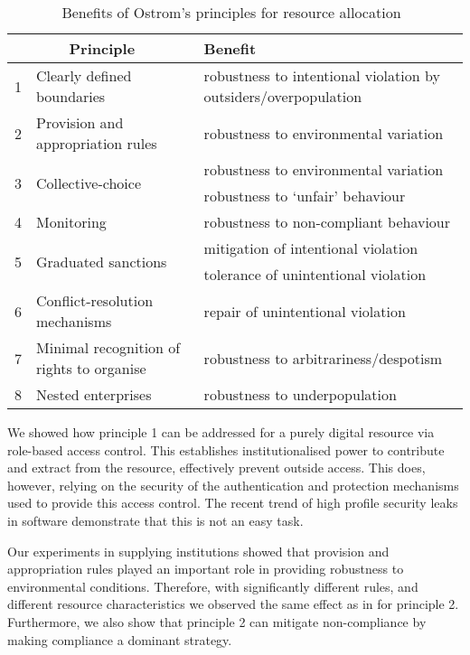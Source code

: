 \begin{table}[ht]
\centering
\caption[Benefits of Ostrom's principles for resource allocation]{Benefits of Ostrom's principles for resource allocation~\citep{Schaumeier2013}}\label{tab:principlebenefit}
\begin{tabularx}{\textwidth}{lp{4cm}X}
\multicolumn{2}{c}{Principle} & Benefit \\
\hline
1 & Clearly defined boundaries & robustness to intentional violation by outsiders/overpopulation \\
2 & Provision and appropriation rules & robustness to environmental variation \\
\multirow{2}{*}{3} & \multirow{2}{*}{Collective-choice} & robustness to environmental variation \\
 & & robustness to `unfair' behaviour \\
4 & Monitoring & robustness to non-compliant behaviour \\
\multirow{2}{*}{5} & \multirow{2}{*}{Graduated sanctions} & mitigation of intentional violation \\
 & & tolerance of unintentional violation \\
6 & Conflict-resolution mechanisms & repair of unintentional violation \\
7 & Minimal recognition of rights to organise & robustness to arbitrariness/despotism \\
8 & Nested enterprises & robustness to underpopulation \\
\end{tabularx}
\end{table}

We showed how principle 1 can be addressed for a purely digital resource via
role-based access control. This establishes institutionalised power to
contribute and extract from the resource, effectively prevent outside access.
This does, however, relying on the security of the authentication and
protection mechanisms used to provide this access control. The recent trend of
high profile security leaks in software demonstrate that this is not an easy
task.

Our experiments in supplying institutions showed that provision and
appropriation rules played an important role in providing robustness to
environmental conditions. Therefore, with significantly different rules, and
different resource characteristics we observed the same effect as in
\citet{Pitt2012b} for principle 2. Furthermore, we also show that principle 2
can mitigate non-compliance by making compliance a dominant strategy.

